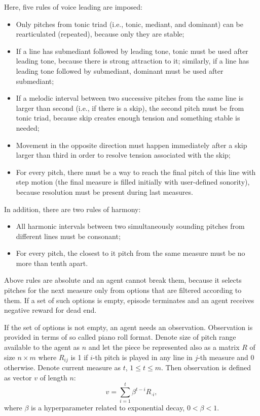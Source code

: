 \documentclass{article}
\begin{document}
Here, five rules of voice leading are imposed:
\begin{itemize}
	\item Only pitches from tonic triad (i.e., tonic, mediant, and dominant) can be rearticulated (repeated), because only they are stable;
	\item If a line has submediant followed by leading tone, tonic must be used after leading tone, because there is strong attraction to it; similarly, if a line has leading tone followed by submediant, dominant must be used after submediant;
	\item If a melodic interval between two successive pitches from the same line is larger than second (i.e., if there is a skip), the second pitch must be from tonic triad, because skip creates enough tension and something stable is needed;
	\item Movement in the opposite direction must happen immediately after a skip larger than third in order to resolve tension associated with the skip;
	\item For every pitch, there must be a way to reach the final pitch of this line with step motion (the final measure is filled initially with user-defined sonority), because resolution must be present during last measures.
\end{itemize}
In addition, there are two rules of harmony:
\begin{itemize}
	\item All harmonic intervals between two simultaneously sounding pitches from different lines must be consonant;
	\item For every pitch, the closest to it pitch from the same measure must be no more than tenth apart.
\end{itemize}

Above rules are absolute and an agent cannot break them, because it selects pitches for the next measure only from options that are filtered according to them. If a set of such options is empty, episode terminates and an agent receives negative reward for dead end.

If the set of options is not empty, an agent needs an observation. Observation is provided in terms of so called piano roll format. Denote size of pitch range available to the agent as $n$ and let the piece be represented also as a matrix $R$ of size $n \times m$ where $R_{ij}$ is 1 if $i$-th pitch is played in any line in $j$-th measure and 0 otherwise. Denote current measure as $t$, $1 \le t \le m$. Then observation is defined as vector $v$ of length $n$:
$$v = \sum_{i = 1}^t \beta^{t - i} R_{\cdot i},$$
where $\beta$ is a hyperparameter related to exponential decay, $0 < \beta < 1$.
\end{document}
